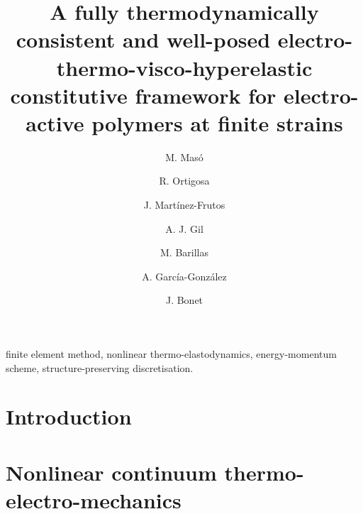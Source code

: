 \documentclass[preprint,12pt]{elsarticle}
\begin{document}
\begin{frontmatter}

\title{A fully thermodynamically consistent and well-posed electro-thermo-visco-hyperelastic constitutive framework for electro-active polymers at finite strains}

\author[cimne]{M. Masó} 
\author[upct]{R. Ortigosa}
\author[upct]{J. Martínez-Frutos}
\author[swansea]{A. J. Gil}
\author[cimne]{M. Barillas}
\author[cimne,upc]{A. García-González} 
\author[cimne,upc]{J. Bonet}


\address[cimne]{International Centre for Numerical Methods in Engineering (CIMNE), Barcelona, Spain}
\address[upct]{Computational Mechanics and Scientific Computing Group,\\
	Technical University of Cartagena (UPCT), Campus Muralla del Mar, 30202, Cartagena (Murcia), Spain}
\address[swansea]{Zienkiewicz Centre for Computational Engineering, College of Engineering \\
  Swansea University, Bay Campus, SA1 8EN, United Kingdom}
\address[upc]{Universitat Politècnica de Catalunya (UPC), Barcelona, Spain}


\begin{abstract}

\end{abstract}


\begin{keyword} finite element method, nonlinear thermo-elastodynamics, energy-momentum scheme, structure-preserving discretisation.
\end{keyword}


\end{frontmatter}



\section{Introduction}


\clearpage
\section{Nonlinear continuum thermo-electro-mechanics}\label{sec:nonlinear continuum electromechanics}

\end{document}
